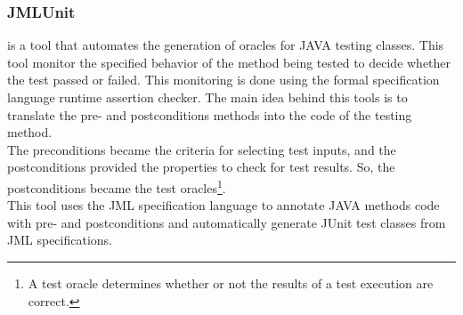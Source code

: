 \documentclass[10pt, conference, compsocconf]{IEEEtran}
\begin{document}
\subsubsection{\textbf{JMLUnit}\cite{Cheon04thejml}} is a tool that automates the generation of oracles for JAVA testing classes. This tool
monitor the specified behavior of the method being tested to decide whether the test passed or failed.
This monitoring is done using the formal specification language runtime assertion checker.
The main idea behind this tools is to translate the pre- and postconditions methods into the code of the testing method.\\
The preconditions became the criteria for selecting test inputs, and the postconditions provided the properties to check for
test results. So, the postconditions became the test oracles\footnote{A test oracle determines whether or not the results of a test
execution are correct\cite{Peters95generatinga}.}.\\
This tool uses the JML\cite{Burdy03anoverview} specification language to annotate JAVA methods code with pre- and postconditions and
automatically generate JUnit test classes from JML specifications.

\end{document}
